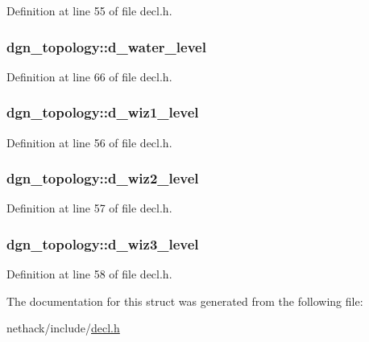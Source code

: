 Definition at line 55 of file decl.\+h.

\hypertarget{structdgn__topology_a2a5a4ab491e8510d3da84a68a30ff06f}{
\subsubsection[{d\+\_\+water\+\_\+level}]{ dgn\+\_\+topology\+::d\+\_\+water\+\_\+level}}\label{structdgn__topology_a2a5a4ab491e8510d3da84a68a30ff06f}


Definition at line 66 of file decl.\+h.

\hypertarget{structdgn__topology_a6168834a03774c5910089630f8caeab4}{
\subsubsection[{d\+\_\+wiz1\+\_\+level}]{ dgn\+\_\+topology\+::d\+\_\+wiz1\+\_\+level}}\label{structdgn__topology_a6168834a03774c5910089630f8caeab4}


Definition at line 56 of file decl.\+h.

\hypertarget{structdgn__topology_af042505c7b918153ac9b36c6d41bc365}{
\subsubsection[{d\+\_\+wiz2\+\_\+level}]{ dgn\+\_\+topology\+::d\+\_\+wiz2\+\_\+level}}\label{structdgn__topology_af042505c7b918153ac9b36c6d41bc365}


Definition at line 57 of file decl.\+h.

\hypertarget{structdgn__topology_a2f1fcd278eba9b31a12814dd0cf7fb0e}{
\subsubsection[{d\+\_\+wiz3\+\_\+level}]{ dgn\+\_\+topology\+::d\+\_\+wiz3\+\_\+level}}\label{structdgn__topology_a2f1fcd278eba9b31a12814dd0cf7fb0e}


Definition at line 58 of file decl.\+h.



The documentation for this struct was generated from the following file\+:\begin{DoxyCompactItemize}
\item 
nethack/include/\hyperlink{decl_8h}{decl.\+h}\end{DoxyCompactItemize}
